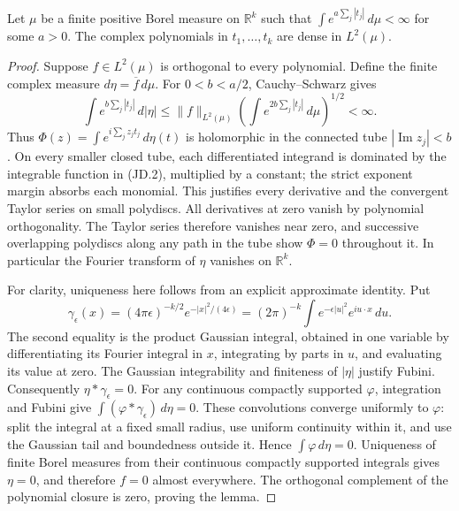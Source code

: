 \begin{lemma}
Let \(\mu\) be a finite positive Borel measure on \(\mathbb R^k\)
such that \(\int e^{a\sum_j|t_j|}\,d\mu<\infty\) for some
\(a>0\).  The complex polynomials in \(t_1,\ldots,t_k\) are
dense in \(L^2(\mu)\).
\end{lemma}
\begin{proof}
Suppose \(f\in L^2(\mu)\) is orthogonal to every polynomial.
Define the finite complex measure \(d\eta=\overline f\,d\mu\).
For \(0<b<a/2\), Cauchy--Schwarz gives
\[
 \int e^{b\sum_j|t_j|}\,d|\eta|
 \le \|f\|_{L^2(\mu)}
       \left(\int e^{2b\sum_j|t_j|}\,d\mu\right)^{1/2}<\infty.
 \tag{JD.2}
\]
Thus \(\Phi(z)=\int e^{i\sum_jz_jt_j}\,d\eta(t)\) is
holomorphic in the connected tube \(|\operatorname{Im}z_j|<b\).
On every smaller closed tube, each differentiated integrand is
dominated by the integrable function in (JD.2), multiplied by a
constant; the strict exponent margin absorbs each monomial.  This
justifies every derivative and the convergent Taylor series on small
polydiscs.  All derivatives at zero vanish by polynomial
orthogonality.  The Taylor series therefore vanishes near zero, and
successive overlapping polydiscs along any path in the tube show
\(\Phi=0\) throughout it.  In particular the Fourier transform
of \(\eta\) vanishes on \(\mathbb R^k\).

For clarity, uniqueness here follows from an explicit approximate
identity.  Put
\[
 \gamma_\epsilon(x)=(4\pi\epsilon)^{-k/2}
                   e^{-|x|^2/(4\epsilon)}
   =(2\pi)^{-k}\int e^{-\epsilon|u|^2}e^{iu\cdot x}\,du.
 \tag{JD.3}
\]
The second equality is the product Gaussian integral, obtained in
one variable by differentiating its Fourier integral in \(x\),
integrating by parts in \(u\), and evaluating its value at zero.
The Gaussian integrability and finiteness of \(|\eta|\) justify
Fubini.  Consequently \(\eta*\gamma_\epsilon=0\).  For any
continuous compactly supported \(\varphi\), integration and
Fubini give \(\int(\varphi*\gamma_\epsilon)\,d\eta=0\).
These convolutions converge uniformly to \(\varphi\): split the
integral at a fixed small radius, use uniform continuity within it,
and use the Gaussian tail and boundedness outside it.  Hence
\(\int\varphi\,d\eta=0\).  Uniqueness of finite Borel measures
from their continuous compactly supported integrals gives
\(\eta=0\), and therefore \(f=0\) almost everywhere.  The
orthogonal complement of the polynomial closure is zero, proving
the lemma.
\end{proof}

